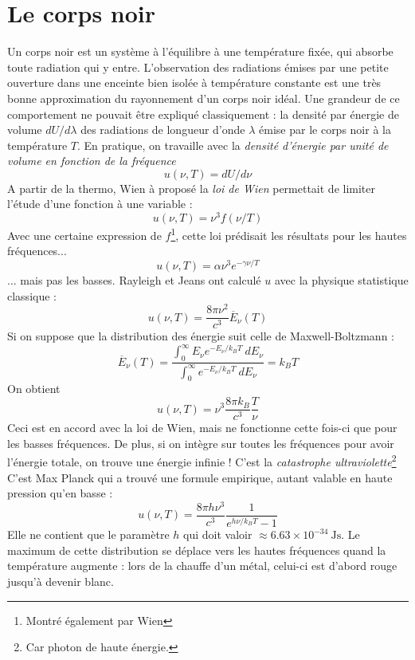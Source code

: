 \documentclass	[11pt, a4paper, openany]{book}
\begin{document}
\section{Le corps noir}
Un corps noir est un système à l'équilibre à une température fixée, qui absorbe toute radiation qui y 
entre. L'observation des radiations émises par une petite ouverture dans une enceinte bien isolée à 
température constante est une très bonne approximation du rayonnement d'un corps noir idéal. Une 
grandeur de ce comportement ne pouvait être expliqué classiquement : la densité par énergie de volume 
$dU/d\lambda$ des radiations de longueur d'onde $\lambda$ émise par le corps noir à la température $T$.
En pratique, on travaille avec la \textit{densité d'énergie par unité de volume en fonction de la fréquence} 
\begin{equation}
u(\nu,T) = dU/d\nu
\end{equation}
A partir de la thermo, Wien à proposé la \textit{loi de Wien} permettait de limiter l'étude d'une fonction
à une variable :
\begin{equation}
u(\nu,T) = \nu^3f(\nu/T)
\end{equation}
Avec une certaine expression de $f$\footnote{Montré également par Wien}, cette loi prédisait les résultats 
pour les hautes fréquences...
\begin{equation}
u(\nu,T) = \alpha \nu^3 e^{-\gamma\nu/T}
\end{equation}
... mais pas les basses. Rayleigh et Jeans ont calculé $u$ avec la physique statistique classique :
\begin{equation}
u(\nu,T) = \dfrac{8\pi\nu^2}{c^3}\overline{E}_\nu(T)
\label{eq:IdeePlanck}
\end{equation}
Si on suppose que la distribution des énergie suit celle de Maxwell-Boltzmann :
\begin{equation}
\overline{E}_\nu(T) = \dfrac{\int_0^\infty E_\nu e^{-E_\nu/k_BT}\ dE_\nu}{\int_0^\infty
e^{-E_\nu/k_BT}\ dE_\nu} = k_BT
\label{eq:CalculEv}
\end{equation}
On obtient
\begin{equation}
u(\nu,T) = \nu^3\dfrac{8\pi k_B}{c^3}\dfrac{T}{\nu}
\end{equation}
Ceci est en accord avec la loi de Wien, mais ne fonctionne cette fois-ci que pour les basses fréquences. De 
plus, si on intègre sur toutes les fréquences pour avoir l'énergie totale, on trouve une énergie infinie ! 
C'est la \textit{catastrophe ultraviolette}\footnote{Car photon de haute énergie.}\\
C'est Max Planck qui a trouvé une formule empirique, autant valable en haute pression qu'en basse :
\begin{equation}
u(\nu,T) = \dfrac{8\pi h\nu^3}{c^3}\dfrac{1}{e^{h\nu/k_BT}-1}
\label{eq:FormulePlanck}
\end{equation}
Elle ne contient que le paramètre $h$ qui doit valoir $\approx 6.63\times 10^{-34}\ \text{Js}$. Le maximum 
de cette distribution se déplace vers les hautes fréquences quand la température augmente : lors de la 
chauffe d'un métal, celui-ci est d'abord rouge jusqu'à devenir blanc.\\
\end{document}
